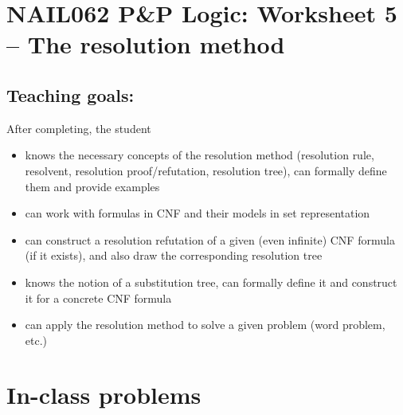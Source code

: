\section*{NAIL062 P\&P Logic: Worksheet 5 -- The resolution method}


\subsection*{Teaching goals:} After completing, the student

    \begin{itemize}\setlength{\itemsep}{0pt}
        \item knows the necessary concepts of the resolution method (resolution rule, resolvent, resolution proof/refutation, resolution tree), can formally define them and provide examples
        \item can work with formulas in CNF and their models in set representation
        \item can construct a resolution refutation of a given (even infinite) CNF formula (if it exists), and also draw the corresponding resolution tree
        \item knows the notion of a substitution tree, can formally define it and construct it for a concrete CNF formula
        \item can apply the resolution method to solve a given problem (word problem, etc.)
    \end{itemize}
    

\section*{In-class problems}


